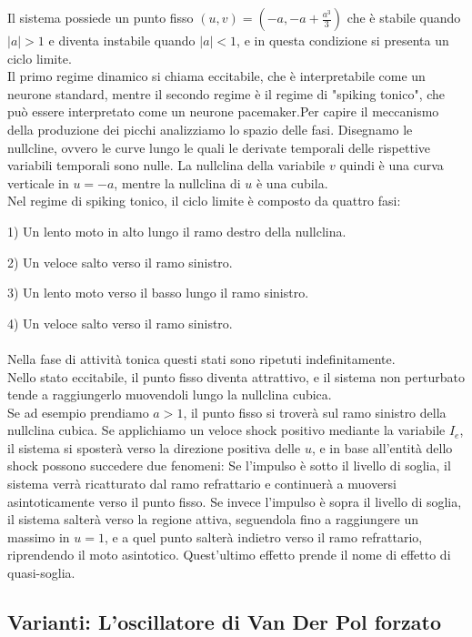 \documentclass[12pt]{article}
\begin{document}
Il sistema possiede un punto fisso $(u,v) = \left(-a,-a+\frac{a^3}{3} \right) $ che è stabile quando $|a|>1$ e diventa instabile quando $|a|<1$, e in questa condizione si presenta un ciclo limite. \\
Il primo regime dinamico si chiama eccitabile, che è interpretabile come un neurone standard, mentre il secondo regime è il regime di "spiking tonico", che può essere interpretato come un neurone pacemaker.Per capire il meccanismo della produzione dei picchi analizziamo lo spazio delle fasi. Disegnamo le nullcline, ovvero le curve lungo le quali le derivate temporali delle rispettive variabili temporali sono nulle. La nullclina della variabile $v$ quindi è una curva verticale in $u = -a$, mentre la nullclina di $u$ è una cubila. \\
Nel regime di spiking tonico, il ciclo limite è composto da quattro fasi:

1) Un lento moto in alto lungo il ramo destro della nullclina. 

2) Un veloce salto verso il ramo sinistro.

3) Un lento moto verso il basso lungo il ramo sinistro. 

4) Un veloce salto verso il ramo sinistro.\\ \\
Nella fase di attività tonica questi stati sono ripetuti indefinitamente. \\
Nello stato eccitabile, il punto fisso diventa attrattivo, e il sistema non perturbato tende a raggiungerlo muovendoli lungo la nullclina cubica. \\
Se ad esempio prendiamo $a > 1$, il punto fisso si troverà sul ramo sinistro della nullclina cubica. Se applichiamo un veloce shock positivo mediante la variabile $I_e$, il sistema si sposterà verso la direzione positiva delle $u$, e in base all'entità dello shock possono succedere due fenomeni: Se l'impulso è sotto il livello di soglia, il sistema verrà ricatturato dal ramo refrattario e continuerà a muoversi asintoticamente verso il punto fisso. Se invece l'impulso è sopra il livello di soglia, il sistema salterà verso la regione attiva, seguendola fino a raggiungere un massimo in $u = 1$, e a quel punto salterà indietro verso il ramo refrattario, riprendendo il moto asintotico. Quest'ultimo effetto prende il nome di effetto di quasi-soglia.


  
\subsection{Varianti: L'oscillatore di Van Der Pol forzato}
\end{document}
